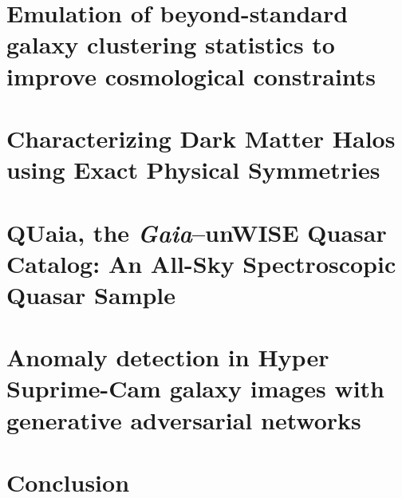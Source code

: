 \documentclass[12pt,oneside,letterpaper]{report}
\begin{document}
\chapter{Emulation of beyond-standard galaxy clustering statistics to improve cosmological constraints}
\setcounter{section}{-1}
\label{chp-aemulus}
%

\chapter{Characterizing Dark Matter Halos using Exact Physical Symmetries}
\setcounter{section}{-1}
\label{chp-eqcosmo}


\chapter{QUaia, the \emph{Gaia}–unWISE Quasar Catalog: An All-Sky Spectroscopic Quasar Sample}
\setcounter{section}{-1}
\label{chp-quaia}
%

\chapter{Anomaly detection in Hyper Suprime-Cam galaxy images with generative adversarial networks}
\setcounter{section}{-1}
\label{chp-anomalies}
%

\chapter{Conclusion}
\setcounter{section}{-1}
\label{chp-conclusion}
% 


% 
%
%
%
%



\appendix
\end{document}
